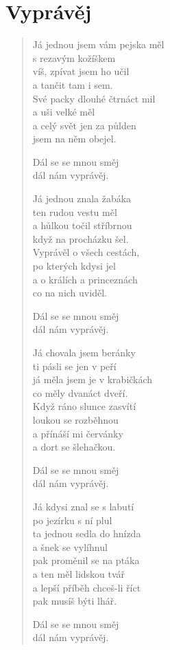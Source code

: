 \section*{Vyprávěj}

\begin{verse}
Já jednou jsem vám pejska měl \\
s rezavým kožíškem \\
víš, zpívat jsem ho učil \\
a tančit tam i sem.\\
Své packy dlouhé čtrnáct mil\\
a uši velké měl\\
a celý svět jen za půlden\\
jsem na něm obejel.

Dál se se mnou směj\\
dál nám vyprávěj.

Já jednou znala žabáka\\
ten rudou vestu měl\\
a hůlkou točil stříbrnou\\
když na procházku šel.\\
Vyprávěl o všech cestách,\\
po kterých kdysi jel\\
a o králích a princeznách\\
co na nich uviděl.

Dál se se mnou směj\\
dál nám vyprávěj.

Já chovala jsem beránky\\
ti pásli se jen v peří\\
já měla jsem je v krabičkách\\
co měly dvanáct dveří.\\
Když ráno slunce zasvítí\\
loukou se rozběhnou\\
a přínáší mi červánky\\
a dort se šlehačkou.

Dál se se mnou směj\\
dál nám vyprávěj.

Já kdysi znal se s labutí\\
po jezírku s ní plul\\
ta jednou sedla do hnízda\\
a šnek se vylíhnul\\
pak proměnil se na ptáka\\
a ten měl lidskou tvář\\
a lepší příběh chceš-li říct\\
pak musíš býti lhář.

Dál se se mnou směj\\
dál nám vyprávěj.

\end{verse}
